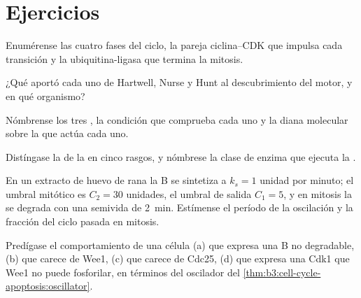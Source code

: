 \section{Ejercicios}

\begin{exercise}[$\star$]\label{exo:b3:cell-cycle-apoptosis:1}
Enumérense las cuatro fases del ciclo, la pareja ciclina--CDK que impulsa
cada transición y la ubiquitina-ligasa que termina la mitosis.
\end{exercise}

\begin{exercise}[$\star$]\label{exo:b3:cell-cycle-apoptosis:2}
¿Qué aportó cada uno de Hartwell, Nurse y Hunt al descubrimiento del
motor, y en qué organismo?
\end{exercise}

\begin{exercise}[$\star$]\label{exo:b3:cell-cycle-apoptosis:3}
Nómbrense los tres , la condición que comprueba cada uno
y la diana molecular sobre la que actúa cada uno.
\end{exercise}

\begin{exercise}[$\star$]\label{exo:b3:cell-cycle-apoptosis:4}
Distíngase la  de la  en cinco rasgos, y nómbrese la
clase de enzima que ejecuta la .
\end{exercise}

\begin{exercise}[$\star\star$]\label{exo:b3:cell-cycle-apoptosis:5}
En un extracto de huevo de rana la  B se sintetiza a
$k_{s} = 1$ unidad por minuto; el umbral mitótico es $C_{2} = 30$
unidades, el umbral de salida $C_{1} = 5$, y en mitosis la  se
degrada con una semivida de \qty{2}{min}. Estímense el período de la
oscilación y la fracción del ciclo pasada en mitosis.
\end{exercise}

\begin{exercise}[$\star\star$]\label{exo:b3:cell-cycle-apoptosis:6}
Predígase el comportamiento de una célula (a) que expresa una  B
no degradable, (b) que carece de Wee1, (c) que carece de Cdc25, (d) que
expresa una Cdk1 que Wee1 no puede fosforilar, en términos del oscilador
del \cref{thm:b3:cell-cycle-apoptosis:oscillator}.
\end{exercise}

